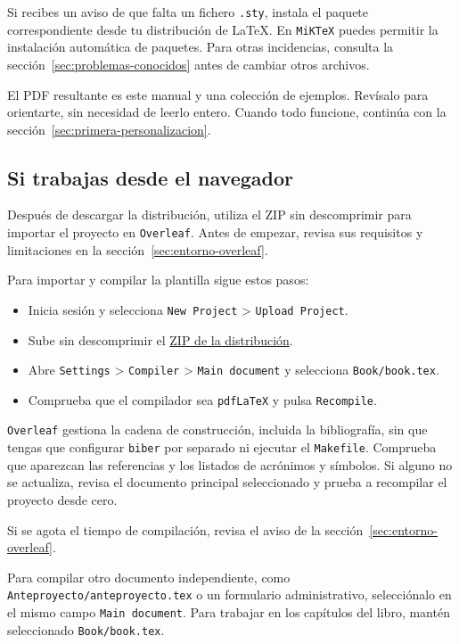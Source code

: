 Si recibes un aviso de que falta un fichero \texttt{.sty}, instala el paquete correspondiente desde tu distribución de \LaTeX{}. En \texttt{MiKTeX} puedes permitir la instalación automática de paquetes. Para otras incidencias, consulta la sección~\ref{sec:problemas-conocidos} antes de cambiar otros archivos.

El PDF resultante es este manual y una colección de ejemplos. Revísalo para orientarte, sin necesidad de leerlo entero. Cuando todo funcione, continúa con la sección~\ref{sec:primera-personalizacion}.

\subsection{Si trabajas desde el navegador}
\label{sec:compilacion-navegador}
\label{sec:compilacion-overleaf}

Después de descargar la distribución, utiliza el ZIP sin descomprimir para importar el proyecto en \texttt{Overleaf}. Antes de empezar, revisa sus requisitos y limitaciones en la sección~\ref{sec:entorno-overleaf}.

Para importar y compilar la plantilla sigue estos pasos:

\begin{itemize}
  \item Inicia sesión y selecciona \texttt{New Project} > \texttt{Upload Project}.
  \item Sube sin descomprimir el \href{https://www.dropbox.com/scl/fi/tgaa8elj9sq3qbssptuys/03-PhDTFMTFG-LaTeX-Template.zip?rlkey=t01rv4tizsfw96vy0dcp902z0&dl=1}{ZIP de la distribución}.
  \item Abre \texttt{Settings} > \texttt{Compiler} > \texttt{Main document} y selecciona \texttt{Book/book.tex}.
  \item Comprueba que el compilador sea \texttt{pdfLaTeX} y pulsa \texttt{Recompile}.
\end{itemize}

\texttt{Overleaf} gestiona la cadena de construcción, incluida la bibliografía, sin que tengas que configurar \texttt{biber} por separado ni ejecutar el \texttt{Makefile}. Comprueba que aparezcan las referencias y los listados de acrónimos y símbolos. Si alguno no se actualiza, revisa el documento principal seleccionado y prueba a recompilar el proyecto desde cero.

Si se agota el tiempo de compilación, revisa el aviso de la sección~\ref{sec:entorno-overleaf}.

Para compilar otro documento independiente, como \texttt{Anteproyecto/anteproyecto.tex} o un formulario administrativo, selecciónalo en el mismo campo \texttt{Main document}. Para trabajar en los capítulos del libro, mantén seleccionado \texttt{Book/book.tex}.

